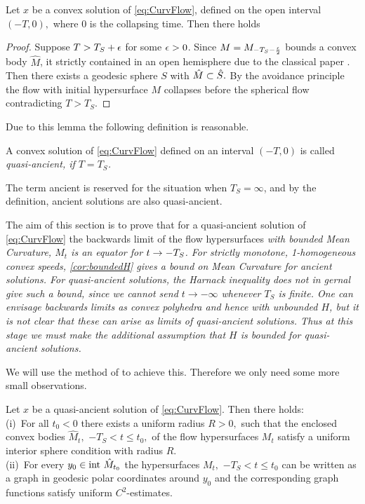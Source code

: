 \documentclass{amsart}
\begin{document}
\begin{lemma}
Let $x$ be a convex solution of \eqref{eq:CurvFlow}, defined on the open interval $(-T,0),$ where $0$ is the collapsing time. Then 
there holds
\end{lemma}

\begin{proof}
Suppose $T>T_S+\epsilon$ for some $\epsilon>0$. Since $M=M_{-T_S-\frac{\epsilon}{2}}$ bounds a convex body $\hat{M}$, it strictly contained in an open hemisphere due to the classical paper \cite{CarmoWarner:/1970}. Then there exists a geodesic sphere $S$ with $\hat{M}\subset\hat{S}.$ By the avoidance principle the flow with initial hypersurface $M$ collapses before the spherical flow contradicting $T>T_S$.
\end{proof}

Due to this lemma the following definition is reasonable.

\begin{definition}
A convex solution of \eqref{eq:CurvFlow} defined on an interval $(-T,0)$ is called \it{quasi-ancient}, if $T=T_S$.
\end{definition}

The term ancient is reserved for the situation when \(T_S=\infty\), and by the definition, ancient solutions are also quasi-ancient.

The aim of this section is to prove that for a quasi-ancient solution of \eqref{eq:CurvFlow} the backwards limit of the flow hypersurfaces \it{with bounded Mean Curvature}, $M_t$ is an equator for $t\rightarrow -T_S$. For strictly monotone, 1-homogeneous convex speeds, \cref{cor:boundedH} gives a bound on Mean Curvature for ancient solutions. For quasi-ancient solutions, the Harnack inequality does not in gernal give such a bound, since we cannot send \(t \to -\infty\) whenever \(T_S\) is finite. One can envisage backwards limits as convex polyhedra and hence with unbounded \(H\), but it is not clear that these can arise as limits of quasi-ancient solutions. Thus at this stage we must make the additional assumption that \(H\) is bounded for quasi-ancient solutions.

We will use the method of \cite{MakowskiScheuer:/2013} to achieve this. Therefore we only need some more small observations.

\begin{lemma}\label{ISC}
Let $x$ be a quasi-ancient solution of \eqref{eq:CurvFlow}. Then there holds:\\

(i)~For all $t_0<0$ there exists a uniform radius $R>0,$ such that the enclosed convex bodies $\hat{M}_t,$ $-T_S<t\leq t_0,$ of the flow hypersurfaces $M_t$ satisfy a uniform interior sphere condition with radius $R.$\\

(ii)~For every $y_0\in\mathrm{int}~\hat{M}_{t_0}$ the hypersurfaces $M_t,$ $-T_S<t\leq t_0$ can be written as a graph in geodesic polar coordinates around $y_0$ and the corresponding graph functions satisfy uniform $C^2$-estimates.
\end{lemma}
\end{document}
